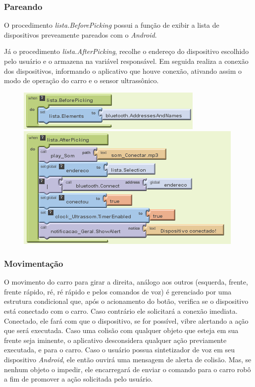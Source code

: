 \documentclass[portugues, brazil, a4paper,12pt]{article}
\begin{document}
\subsubsection{Pareando}
O procedimento \textit{lista.BeforePicking} possui a função de exibir a lista de dispositivos preveamente pareados com o \textit{Android}.

Já o procedimento \textit{lista.AfterPicking}, recolhe o endereço do dispositivo escolhido pelo usuário e o armazena na variável responsável. Em seguida realiza a conexão dos dispositivos, informando o aplicativo que houve conexão, ativando assim o modo de operação do carro e o sensor ultrassônico.

\begin{figure}[H]
\centering
\begin{minipage}[c]{0.49\linewidth}
\centering
	\includegraphics[scale=.8]{img/controle/antesConectar.png}
	
\end{minipage}
\hfill
\begin{minipage}[c]{0.49\linewidth}
\centering
	\includegraphics[scale=.8]{img/controle/depoisConectar.png}
	
\end{minipage}
\end{figure}


\subsubsection{Movimentação}
O movimento do carro para girar a direita, análogo aos outros (esquerda, frente, frente rápido, ré, ré rápido e pelos comandos de voz) é gerenciado por uma estrutura condicional que, após o acionamento do botão, verifica se o dispositivo está conectado com o carro. Caso contrário ele solicitará a conexão imediata. Conectado, ele fará com que o dispositivo, se for possível, vibre alertando a ação que será executada. Caso uma colisão com qualquer objeto que esteja em sua frente seja iminente, o aplicativo desconsidera qualquer ação previamente executada, e para o carro. Caso o usuário possua sintetizador de voz em seu dispositivo \textit{Android}, ele então ouvirá uma mensagem de alerta de colisão. Mas, se nenhum objeto o impedir, ele encarregará de enviar o comando para o carro robô a fim de promover a ação solicitada pelo usuário.
\end{document}
